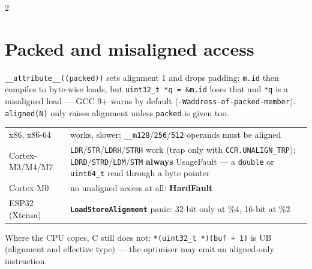 \documentclass[8pt]{extarticle}
\newcommand\ct[1]{\texttt{#1}}
\begin{document}
\begin{multicols}{2}
\section{Packed and misaligned access}
\ct{\_\_attribute\_\_((packed))} sets alignment 1 and drops padding; \ct{m.id} then compiles to
byte-wise loads, but \ct{uint32\_t *q = \&m.id} loses that and \ct{*q} is a misaligned load —
GCC 9+ warns by default (\ct{-Waddress-of-packed-member}). \ct{aligned(N)} only raises
alignment unless \ct{packed} is given too.\par
{\scriptsize\setlength{\tabcolsep}{2pt}
\begin{tabular}{@{}>{\raggedright\arraybackslash}p{17mm}>{\raggedright\arraybackslash}p{60mm}@{}}
\toprule
x86, x86-64 & works, slower; \ct{\_\_m128}/\ct{256}/\ct{512} operands must be aligned\\
Cortex-M3/M4/M7 & \ct{LDR}/\ct{STR}/\ct{LDRH}/\ct{STRH} work (trap only with \ct{CCR.UNALIGN\_TRP});
  \ct{LDRD}/\ct{STRD}/\ct{LDM}/\ct{STM} \textbf{always} UsageFault — a \ct{double} or
  \ct{uint64\_t} read through a byte pointer\\
Cortex-M0 & no unaligned access at all: \textbf{HardFault}\\
ESP32 (Xtensa) & \textbf{\ct{LoadStoreAlignment}} panic: 32-bit only at \%4, 16-bit at \%2\\
\bottomrule
\end{tabular}}\par
Where the CPU copes, C still does not: \ct{*(uint32\_t *)(buf + 1)} is UB (alignment and
effective type) — the optimiser may emit an aligned-only instruction.

\columnbreak


\end{multicols}
\end{document}
